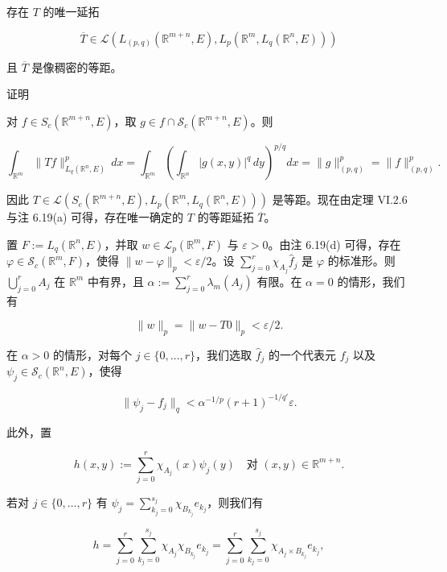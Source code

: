 \begin{lemma}

存在 $ T $ 的唯一延拓

\[
\overline{T} \in \mathcal{L}\left(L_{(p,q)}(\mathbb{R}^{m+n},E),L_{p}\left(\mathbb{R}^{m},L_{q}(\mathbb{R}^{n},E)\right)\right)
\]

且 $ \overline{T} $ 是像稠密的等距。

证明

\begin{subitems}
\item

对 $ f \in S_{c}(\mathbb{R}^{m+n},E) $，取 $ g \in f \cap \mathcal{S}_{c}(\mathbb{R}^{m+n},E) $。则

\[
\int_{\mathbb{R}^{m}}\|Tf\|^{p}_{L_{q}(\mathbb{R}^{n},E)}\,dx = \int_{\mathbb{R}^{m}}\left(\int_{\mathbb{R}^{n}}|g(x,y)|^{q}\,dy\right)^{p/q}dx = \|g\|^{p}_{(p,q)} = \|f\|^{p}_{(p,q)} .
\]

因此 $ T \in \mathcal{L}\left(S_{c}(\mathbb{R}^{m+n},E),L_{p}\left(\mathbb{R}^{m},L_{q}(\mathbb{R}^{n},E)\right)\right) $ 是等距。现在由定理 VI.2.6 与注 6.19(a) 可得，存在唯一确定的 $ T $ 的等距延拓 $ \overline{T} $。

\item

置 $ F := L_{q}(\mathbb{R}^{n},E) $，并取 $ w \in \mathcal{L}_{p}(\mathbb{R}^{m},F) $ 与 $ \varepsilon > 0 $。由注 6.19(d) 可得，存在 $ \varphi \in \mathcal{S}_{c}(\mathbb{R}^{m},F) $，使得 $ \|w-\varphi\|_{p} < \varepsilon/2 $。设 $ \sum_{j=0}^{r}\chi_{A_{j}}\hat{f}_{j} $ 是 $ \varphi $ 的标准形。则 $ \bigcup_{j=0}^{r}A_{j} $ 在 $ \mathbb{R}^{m} $ 中有界，且 $ \alpha := \sum_{j=0}^{r}\lambda_{m}(A_{j}) $ 有限。在 $ \alpha = 0 $ 的情形，我们有

\[
\|w\|_{p} = \|w-T0\|_{p} < \varepsilon/2 .
\]

在 $ \alpha > 0 $ 的情形，对每个 $ j \in \{0,\dots,r\} $，我们选取 $ \hat{f}_{j} $ 的一个代表元 $ f_{j} $ 以及 $ \psi_{j} \in \mathcal{S}_{c}(\mathbb{R}^{n},E) $，使得

\[
\|\psi_{j}-f_{j}\|_{q} < \alpha^{-1/p}(r+1)^{-1/q'}\varepsilon .
\]

此外，置

\[
h(x,y) := \sum_{j=0}^{r}\chi_{A_{j}}(x)\psi_{j}(y) \quad \text{对 } (x,y) \in \mathbb{R}^{m+n} .
\]

若对 $ j \in \{0,\dots,r\} $ 有 $ \psi_{j} = \sum_{k_{j}=0}^{s_{j}}\chi_{B_{k_{j}}}e_{k_{j}} $，则我们有

\[
h = \sum_{j=0}^{r}\sum_{k_{j}=0}^{s_{j}}\chi_{A_{j}}\chi_{B_{k_{j}}}e_{k_{j}} = \sum_{j=0}^{r}\sum_{k_{j}=0}^{s_{j}}\chi_{A_{j}\times B_{k_{j}}}e_{k_{j}} ,
\]


\end{subitems}
\end{lemma}
